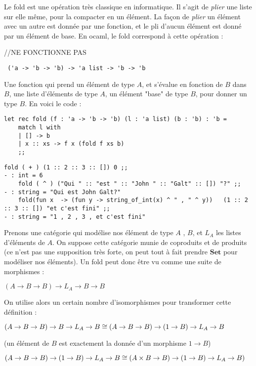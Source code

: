 \documentclass{article}
\begin{document}
Le fold est une opération très classique en informatique. Il s'agit de \textit{plier} une liste sur elle même, pour la compacter en un élément. La façon de \textit{plier} un élément avec un autre est donnée par une fonction, et le pli d'aucun élément est donné par un élément de base. En ocaml, le fold correspond à cette opération :

//NE FONCTIONNE PAS
\begin{verbatim}
 ('a -> 'b -> 'b) -> 'a list -> 'b -> 'b     
\end{verbatim}

Une fonction qui prend un élément de type $A$, et s'évalue en fonction de $B$ dans $B$, une liste d'éléments de type $A$,   un élément "base" de type $B$,  pour donner un type $B$. En voici le code :

\begin{verbatim}
let rec fold (f : 'a -> 'b -> 'b) (l : 'a list) (b : 'b) : 'b = 
    match l with 
    | [] -> b
    | x :: xs -> f x (fold f xs b)
    ;;       
\end{verbatim}


\begin{lstlisting}[languague=OCaml]
    fold ( + ) (1 :: 2 :: 3 :: []) 0 ;; 
- : int = 6 
    fold ( ^ ) ("Qui " :: "est " :: "John " :: "Galt" :: []) "?" ;; 
- : string = "Qui est John Galt?"
    fold(fun x  -> (fun y -> string_of_int(x) ^ " , " ^ y))   (1 :: 2 :: 3 :: []) "et c'est fini" ;; 
- : string = "1 , 2 , 3 , et c'est fini"
\end{lstlisting}

Prenons une catégorie qui modélise nos élément de type $A$ , $B$, et $L_A$ les listes d'éléments de $A$. On suppose cette catégorie munie de coproduits et de produits (ce n'est pas une supposition très forte, on peut tout à fait prendre $\mathbf{Set}$ pour modéliser nos éléments). Un fold peut donc être vu comme une suite de morphismes : 
\begin{center}
$ 
(A \rightarrow B \rightarrow B) \rightarrow L_A \rightarrow B \rightarrow B
$    
\end{center}

On utilise alors un certain nombre d'isomorphismes pour transformer cette définition : 
\begin{center}
 
$(A \rightarrow B \rightarrow B) \rightarrow B \rightarrow L_A \rightarrow B \cong \\ 
(A \rightarrow B \rightarrow B)  \rightarrow (1 \rightarrow B)   \rightarrow L_A \rightarrow B
$
    
\end{center}
(un élément de $B$ est exactement la donnée d'un morphisme $1 \rightarrow B$)
\begin{center}
    
$ (A \rightarrow B \rightarrow B)  \rightarrow (1 \rightarrow B)   \rightarrow L_A \rightarrow B \cong \\ 
(A \times B \rightarrow B) \rightarrow (1 \rightarrow B) \rightarrow L_A \rightarrow B)
$
\end{center}
\end{document}
